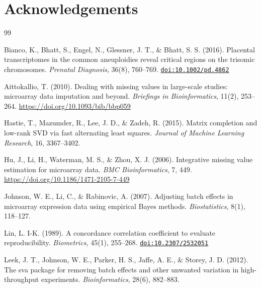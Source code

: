 \documentclass[11pt,a4paper]{article}
\newcommand{\doi}[1]{\href{https://doi.org/#1}{\texttt{doi:#1}}}
\begin{document}
\section*{Acknowledgements}

\begin{thebibliography}{99}

Bianco, K., Bhatt, S., Engel, N., Glessner, J. T., \&
Bhatt, S. S. (2016). Placental transcriptomes in the common
aneuploidies reveal critical regions on the trisomic
chromosomes. \emph{Prenatal Diagnosis}, 36(8), 760--769.
\doi{10.1002/pd.4862}

Aittokallio, T. (2010). Dealing with missing values in
large-scale studies: microarray data imputation and beyond.
\emph{Briefings in Bioinformatics}, 11(2), 253--264.
\url{https://doi.org/10.1093/bib/bbp059}

Hastie, T., Mazumder, R., Lee, J. D., \& Zadeh, R. (2015).
Matrix completion and low-rank SVD via fast alternating least
squares. \emph{Journal of Machine Learning Research}, 16,
3367--3402.

Hu, J., Li, H., Waterman, M. S., \& Zhou, X. J. (2006).
Integrative missing value estimation for microarray data.
\emph{BMC Bioinformatics}, 7, 449.
\url{https://doi.org/10.1186/1471-2105-7-449}

Johnson, W. E., Li, C., \& Rabinovic, A. (2007). Adjusting batch
effects in microarray expression data using empirical Bayes
methods. \emph{Biostatistics}, 8(1), 118--127.

Lin, L. I-K. (1989). A concordance correlation coefficient to
evaluate reproducibility. \emph{Biometrics}, 45(1), 255--268.
\doi{10.2307/2532051}

Leek, J. T., Johnson, W. E., Parker, H. S., Jaffe, A. E., \&
Storey, J. D. (2012). The sva package for removing batch effects
and other unwanted variation in high-throughput experiments.
\emph{Bioinformatics}, 28(6), 882--883.


\end{thebibliography}
\end{document}
